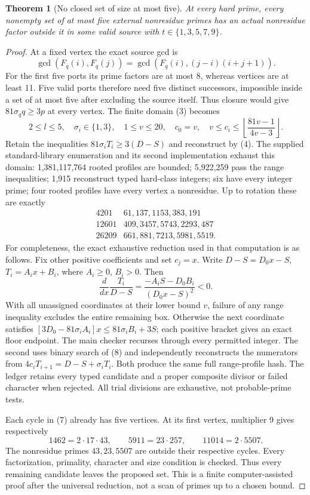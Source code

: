 \documentclass[11pt,reqno]{amsart}
\newtheorem{theorem}{Theorem}\newtheorem{lemma}[theorem]{Lemma}
\begin{document}
\begin{theorem}[No closed set of size at most five]\label{five}
At every hard prime, every nonempty set of at most five external nonresidue primes
has an actual nonresidue factor outside it in some valid source with
$t\in\{1,3,5,7,9\}$.
\end{theorem}
\begin{proof}
At a fixed vertex the exact source gcd is
\[
 \gcd(F_q(i),F_q(j))=\gcd(F_q(i),(j-i)(i+j+1)).                  \tag{5}
\]
For the first five ports its prime factors are at most 8, whereas vertices are at
least 11. Five valid ports therefore need five distinct successors, impossible
inside a set of at most five after excluding the source itself.
Thus closure would give $81\sigma_q q\ge3p$ at every vertex. The finite domain
(3) becomes
\[
 2\le l\le5,\quad\sigma_i\in\{1,3\},\quad1\le v\le20,
 \quad c_0=v,\quad v\le c_i\le\left\lfloor\frac{81v-1}{4v-3}\right\rfloor. \tag{6}
\]
Retain the inequalities $81\sigma_iT_i\ge3(D-S)$ and reconstruct by (4).
The supplied standard-library enumeration and its second implementation exhaust
this domain: 1,381,117,764 rooted profiles are bounded; 5,922,259 pass the range
inequalities; 1,915 reconstruct typed hard-class integers; six have every integer
prime; four rooted profiles have every vertex a nonresidue. Up to rotation these
are exactly
\[
\begin{array}{r|l}
4201&61,137,1153,383,191\\
12601&409,3457,5743,2293,487\\
26209&661,881,7213,5981,5519.
\end{array}                                                   \tag{7}
\]
For completeness, the exact exhaustive reduction used in that computation is as
follows. Fix other positive coefficients and set $c_j=x$. Write
$D-S=D_0x-S$, $T_i=A_ix+B_i$, where $A_i\ge0$, $B_i>0$.
Then
\[
 \frac{d}{dx}\frac{T_i}{D-S}
 =\frac{-A_iS-D_0B_i}{(D_0x-S)^2}<0.                           \tag{8}
\]
With all unassigned coordinates at their lower bound $v$, failure of any range
inequality excludes the entire remaining box. Otherwise the next coordinate
satisfies
$[3D_0-81\sigma_iA_i]x\le81\sigma_iB_i+3S$; each positive bracket gives an
exact floor endpoint. The main checker recurses through every permitted integer.
The second uses binary search of (8) and independently reconstructs the numerators
from $4c_iT_{i+1}=D-S+\sigma_iT_i$. Both produce the same full range-profile hash.
The ledger retains every typed candidate and a proper composite divisor or failed
character when rejected. All trial divisions are exhaustive, not probable-prime tests.

Each cycle in (7) already has five vertices. At its first vertex, multiplier 9 gives
respectively
\[
 1462=2\cdot17\cdot43,\qquad5911=23\cdot257,\qquad11014=2\cdot5507.
\]
The nonresidue primes $43,23,5507$ are outside their respective cycles. Every
factorization, primality, character and size condition is checked. Thus every
remaining candidate leaves the proposed set. This is a finite computer-assisted
proof after the universal reduction, not a scan of primes up to a chosen bound.
\end{proof}
\end{document}
